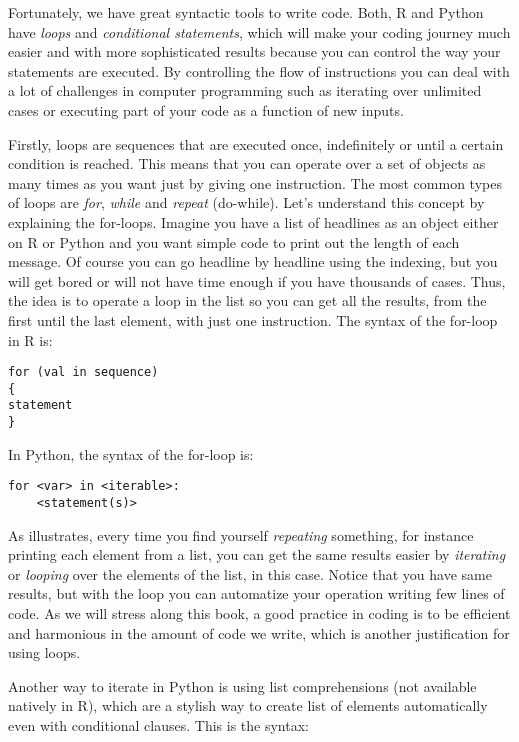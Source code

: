 Fortunately, we have great syntactic tools to write code. Both, R and
Python have \emph{loops} and \emph{conditional statements}, which will
make your coding journey much easier and with more sophisticated
results because you can control the way your statements are
executed. By controlling the flow of instructions you can deal with a
lot of challenges in computer programming such as iterating over
unlimited cases or executing part of your code as a function of new
inputs.

Firstly, loops are sequences that are executed once, indefinitely or
until a certain condition is reached. This means that you can operate
over a set of objects as many times as you want just by giving one
instruction. The most common types of loops are \emph{for},
\emph{while} and \emph{repeat} (do-while). Let’s understand this
concept by explaining the for-loops. Imagine you have a list of
headlines as an object either on R or Python and you want simple code
to print out the length of each message. Of course you can go headline
by headline using the indexing, but you will get bored or will not
have time enough if you have thousands of cases. Thus, the idea is to
operate a loop in the list so you can get all the results, from the
first until the last element, with just one instruction.  The syntax
of the for-loop in R is:

\begin{verbatim}
for (val in sequence)
{
statement
}
\end{verbatim}

In Python, the syntax of the for-loop is:

\begin{verbatim}
for <var> in <iterable>:
    <statement(s)>
\end{verbatim}



As  illustrates, every time you find yourself
\emph{repeating} something, for instance printing each element from a
list, you can get the same results easier by \emph{iterating} or
\emph{looping} over the elements of the list, in this case.  Notice
that you have same results, but with the loop you can automatize your
operation writing few lines of code. As we will stress along this
book, a good practice in coding is to be efficient and harmonious in
the amount of code we write, which is another justification for using
loops.

Another way to iterate in Python is using list comprehensions  (not available natively in R), which are a stylish way to create list of elements automatically even with conditional clauses. This is the syntax:

